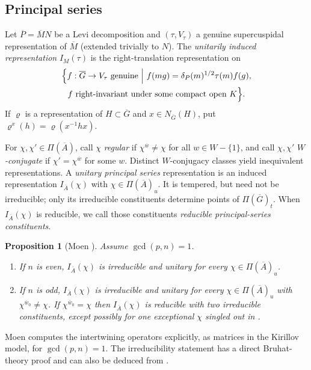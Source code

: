 \documentclass[12pt,letterpaper]{article}
\newtheorem{proposition}[theorem]{Proposition}
\theoremstyle{definition}
\theoremstyle{remark}
\newcommand{\bG}{\overline{G}}
\newcommand{\bA}{\overline{A}}
\newcommand{\bw}{\overline{w}}
\newcommand{\verify}[1]{\textit{[verification pending: #1]}}
\begin{document}
\subsection{Principal series}\label{subsec:ps}

Let $\overline P=\overline MN$ be a Levi decomposition and $(\tau,V_\tau)$ a genuine
supercuspidal representation of $\overline M$ (extended trivially to $N$). The \emph{unitarily
induced representation} $I_M(\tau)$ is the right-translation representation on
\begin{multline*}
\Bigl\{f:\bG\to V_\tau\ \text{genuine}\ \Big|\ f(mg)=\delta_P(m)^{1/2}\tau(m)f(g),\\
f\text{ right-invariant under some compact open }K\Bigr\}.
\end{multline*}
If $\varrho$ is a representation of $H\subset\bG$ and $x\in N_{\bG}(H)$, put
$\varrho^x(h)=\varrho(x^{-1}hx)$.

For $\chi,\chi'\in\Pi(\bA)$, call $\chi$ \emph{regular} if $\chi^{\bw}\ne\chi$ for all
$w\in W-\{1\}$, and call $\chi,\chi'$ \emph{$W$-conjugate} if $\chi'=\chi^{\bw}$ for some $w$.
Distinct $W$-conjugacy classes yield inequivalent representations. A \emph{unitary principal series} representation is an induced representation
$I_{\bA}(\chi)$ with $\chi\in\Pi(\bA)_u$. It is tempered, but need
not be irreducible; only its irreducible constituents determine points
of $\Pi(\bG)_t$.  When $I_{\bA}(\chi)$ is reducible, we call those
constituents \emph{reducible principal-series constituents}.

\begin{proposition}[Moen \cite{Mo88}]\label{prop:moen}
Assume $\gcd(p,n)=1$.
\begin{enumerate}[label=(\alph*),leftmargin=*,itemsep=1pt]
\item If $n$ is even, $I_{\bA}(\chi)$ is irreducible and unitary for every $\chi\in\Pi(\bA)_u$.
\item If $n$ is odd, $I_{\bA}(\chi)$ is irreducible and unitary for every $\chi\in\Pi(\bA)_u$
with $\chi^{\bw_0}\ne\chi$. If $\chi^{\bw_0}=\chi$ then $I_{\bA}(\chi)$ is reducible with two irreducible
constituents, except possibly for one exceptional $\chi$ singled out in \cite{Mo88}.
\end{enumerate}
\end{proposition}
Moen \cite{MoND} computes the intertwining operators explicitly, as matrices in the Kirillov model, for
$\gcd(p,n)=1$. The irreducibility statement has a direct Bruhat-theory proof and can also be deduced from
\cite{FK86}.
\end{document}
